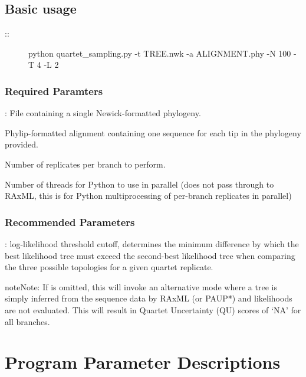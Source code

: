 \documentclass[letterpaper,12pt,english]{sphinxmanual}
\begin{document}
\section{Basic usage}
\label{\detokenize{intro:basic-usage}}\begin{description}
\item[{::}] \leavevmode
python quartet\_sampling.py -t TREE.nwk -a ALIGNMENT.phy -N 100 -T 4 -L 2

\end{description}


\subsection{Required Paramters}
\label{\detokenize{intro:required-paramters}}
: File containing a single Newick-formatted phylogeny.

 Phylip-formatted alignment containing one sequence for each tip in the phylogeny provided.

 Number of replicates per branch to perform.

 Number of threads for Python to use in parallel (does not pass through to RAxML, this is for Python multiprocessing of per-branch replicates in parallel)


\subsection{Recommended Parameters}
\label{\detokenize{intro:recommended-parameters}}
: log-likelihood threshold cutoff, determines the minimum difference by which the best likelihood tree must exceed the second-best likelihood tree when comparing the three possible topologies for a given quartet replicate.

\begin{sphinxadmonition}{note}{Note:}
If  is omitted, this will invoke an alternative mode where a tree is simply inferred from the sequence data by RAxML (or PAUP*) and likelihoods are not evaluated.  This will result in Quartet Uncertainty (QU) scores of ‘NA’ for all branches.
\end{sphinxadmonition}


\chapter{Program Parameter Descriptions}
\label{\detokenize{prog_desc::doc}}\label{\detokenize{prog_desc:program-parameter-descriptions}}
\end{document}
